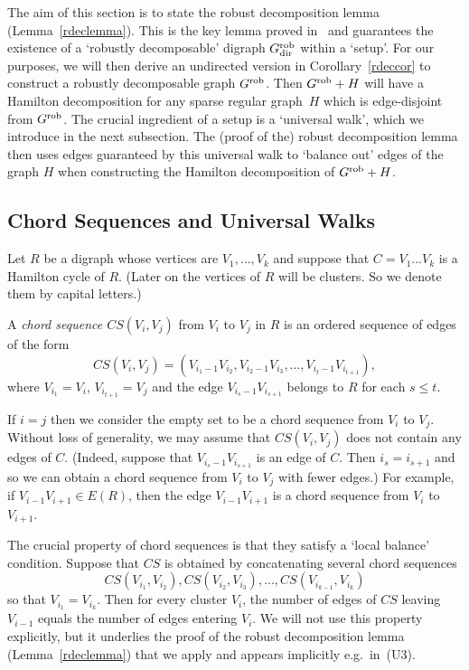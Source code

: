 \documentclass{memo-l}
\numberwithin{section}{chapter}
\numberwithin{equation}{section}
\numberwithin{firstthm}{section}
\numberwithin{figure}{section}
\begin{document}
The aim of this section is to state the robust decomposition lemma (Lem\-ma~\ref{rdeclemma}).
This is the key lemma proved in~\cite{Kelly} and guarantees
the existence of a `robustly decomposable' digraph $G^{\rm rob}_{\rm dir}$ within a `setup'.
For our purposes, we will then derive an undirected version in Corollary~\ref{rdeccor} to construct a robustly decomposable graph $G^{\rm rob}$.
Then $G^{\rm rob}+H$ will have a Hamilton decomposition for any sparse regular graph~$H$ which is edge-disjoint from $G^{\rm rob}$.
The crucial ingredient of a setup is a `universal walk', which we introduce in the next subsection.
The (proof of the) robust decomposition lemma then uses
edges guaranteed by this universal walk to `balance out' edges of the graph $H$ when constructing the Hamilton decomposition of
$G^{\rm rob}+H$.



\subsection{Chord Sequences and Universal Walks}\label{newlabel}
Let $R$ be a digraph whose vertices are $V_1,\dots,V_k$ and suppose that $C=V_1\dots V_k$ is a Hamilton cycle of $R$.
(Later on the vertices of $R$ will be clusters. So we denote them by capital letters.)

A \emph{chord sequence $CS(V_i,V_j)$} from $V_i$ to $V_j$ in $R$ is an ordered sequence of edges of the form
\[ CS(V_i,V_j) = (V_{i_1-1} V_{i_2}, V_{i_2-1} V_{i_3},\dots, V_{i_t-1} V_{i_{t+1}}),\]
where $V_{i_1}=V_i$, $V_{i_{t+1}} = V_j$ and the edge $V_{i_s-1} V_{i_{s+1}}$ belongs to $R$ for each $s\le t$.


If $i=j$ then we consider the empty set to be a chord sequence from $V_i$ to $V_j$. 
Without loss of generality, we may assume that $CS(V_i,V_j)$ does not contain any edges of $C$.
(Indeed, suppose that  $V_{i_s-1} V_{i_{s+1}}$ is an edge of $C$.
Then $i_s=i_{s+1}$ and so we can obtain a chord sequence from $V_i$ to $V_j$ with fewer edges.) 
For example, if $V_{i-1}V_{i+1}\in E(R)$, then the edge $V_{i-1}V_{i+1}$ is a chord sequence from $V_i$ to $V_{i+1}$.

The crucial property of chord sequences is that they satisfy a `local balance' condition. 
Suppose that $CS$ is obtained by concatenating several chord sequences 
$$CS(V_{i_1},V_{i_2}),CS(V_{i_2},V_{i_3}),\dots,CS(V_{i_{k-1}},V_{i_k})$$ so that $V_{i_1}=V_{i_k}$.
Then for every cluster $V_i$, the number of edges of $CS$ leaving $V_{i-1}$ equals the number of edges entering $V_i$.
We will not use this property explicitly, but it underlies the proof of the robust decomposition lemma (Lemma~\ref{rdeclemma}) that we apply
and appears implicitly e.g.~in~(U3).
\end{document}
